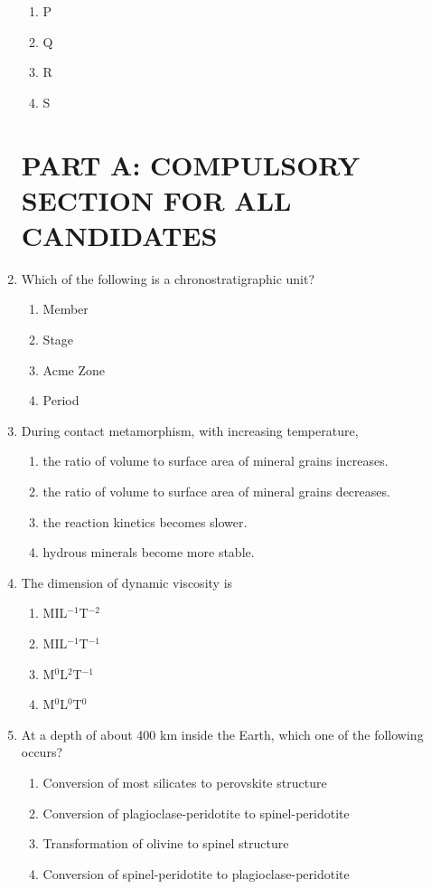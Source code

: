 \documentclass[journal,12pt,onecolumn]{IEEEtran}
\theoremstyle{remark}
\begin{document}
\begin{enumerate}
\begin{enumerate}
\item P
\item Q
\item R
\item S
\end{enumerate}
\vspace{0.5cm}
\newpage
\section*{PART A: COMPULSORY SECTION FOR ALL CANDIDATES}
\vspace{0.5cm}


\item Which of the following is a chronostratigraphic unit?
\begin{enumerate}
\item Member
\item Stage
\item Acme Zone
\item Period
\end{enumerate}
\vspace{0.5cm}

\item During contact metamorphism, with increasing temperature,
\begin{enumerate}
\item the ratio of volume to surface area of mineral grains increases.
\item the ratio of volume to surface area of mineral grains decreases.
\item the reaction kinetics becomes slower.
\item hydrous minerals become more stable.
\end{enumerate}
\vspace{0.5cm}

\item The dimension of dynamic viscosity is
\begin{enumerate}
\item MIL$^{-1}$T$^{-2}$
\item MIL$^{-1}$T$^{-1}$
\item M$^{0}$L$^{2}$T$^{-1}$
\item M$^{0}$L$^{0}$T$^{0}$
\end{enumerate}
\vspace{0.5cm}

\item At a depth of about 400 km inside the Earth, which one of the following occurs?
\begin{enumerate}
\item Conversion of most silicates to perovskite structure
\item Conversion of plagioclase-peridotite to spinel-peridotite
\item Transformation of olivine to spinel structure
\item Conversion of spinel-peridotite to plagioclase-peridotite
\end{enumerate}
\vspace{0.5cm}


\end{enumerate}
\end{document}
